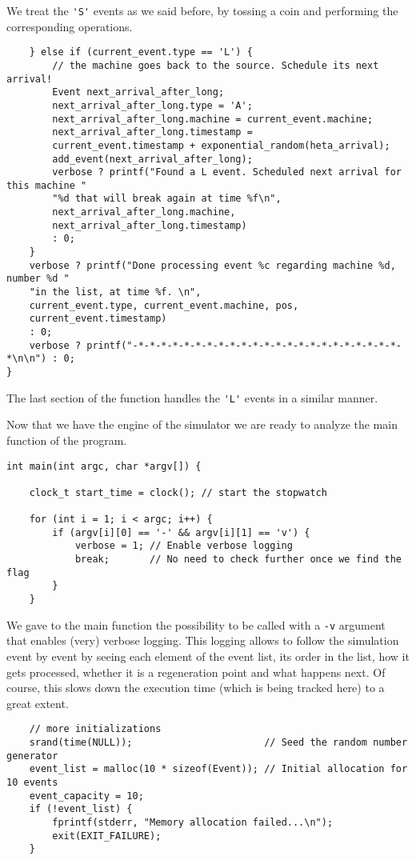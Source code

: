 \documentclass[12pt]{article}
\begin{document}
	We treat the \verb*|'S'| events as we said before, by tossing a coin and performing the corresponding operations.
	\begin{lstlisting}
	} else if (current_event.type == 'L') {
		// the machine goes back to the source. Schedule its next arrival!
		Event next_arrival_after_long;
		next_arrival_after_long.type = 'A';
		next_arrival_after_long.machine = current_event.machine;
		next_arrival_after_long.timestamp =
		current_event.timestamp + exponential_random(heta_arrival);
		add_event(next_arrival_after_long);
		verbose ? printf("Found a L event. Scheduled next arrival for this machine "
		"%d that will break again at time %f\n",
		next_arrival_after_long.machine,
		next_arrival_after_long.timestamp)
		: 0;
	}
	verbose ? printf("Done processing event %c regarding machine %d, number %d "
	"in the list, at time %f. \n",
	current_event.type, current_event.machine, pos,
	current_event.timestamp)
	: 0;
	verbose ? printf("-*-*-*-*-*-*-*-*-*-*-*-*-*-*-*-*-*-*-*-*-*-*-*-*\n\n") : 0;
}
\end{lstlisting}
The last section of the function handles the \verb*|'L'| events in a similar manner.\par
Now that we have the engine of the simulator we are ready to analyze the main function of the program.
\begin{lstlisting}
int main(int argc, char *argv[]) {
	
	clock_t start_time = clock(); // start the stopwatch
	
	for (int i = 1; i < argc; i++) {
		if (argv[i][0] == '-' && argv[i][1] == 'v') {
			verbose = 1; // Enable verbose logging
			break;       // No need to check further once we find the flag
		}
	}\end{lstlisting}
We gave to the main function the possibility to be called with a \verb*|-v| argument that enables (very) verbose logging. This logging allows to follow the simulation event by event by seeing each element of the event list, its order in the list, how it gets processed, whether it is a regeneration point and what happens next. Of course, this slows down the execution time (which is being tracked here) to a great extent.
\begin{lstlisting}
	// more initializations
	srand(time(NULL));                       // Seed the random number generator
	event_list = malloc(10 * sizeof(Event)); // Initial allocation for 10 events
	event_capacity = 10;
	if (!event_list) {
		fprintf(stderr, "Memory allocation failed...\n");
		exit(EXIT_FAILURE);
	}
\end{lstlisting}
\end{document}
